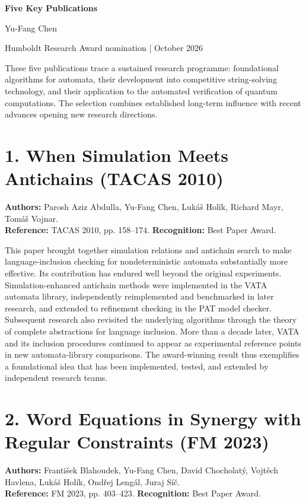 \documentclass[10pt,a4paper]{article}
\begin{document}
\begin{center}
{\Large\bfseries Five Key Publications}\par
{\normalsize Yu-Fang Chen}\par
{\small Humboldt Research Award nomination | October 2026}
\end{center}
\vspace{0.3em}
These five publications trace a sustained research programme: foundational algorithms for automata, their development into competitive string-solving technology, and their application to the automated verification of quantum computations. The selection combines established long-term influence with recent advances opening new research directions.\par
\section{1. When Simulation Meets Antichains (TACAS 2010)}
\textbf{Authors:} Parosh Aziz Abdulla, Yu-Fang Chen, Lukáš Holík, Richard Mayr, Tomáš Vojnar.\\
\textbf{Reference:} TACAS 2010, pp. 158--174. \textbf{Recognition:} Best Paper Award.

This paper brought together simulation relations and antichain search to make language-inclusion checking for nondeterministic automata substantially more effective. Its contribution has endured well beyond the original experiments. Simulation-enhanced antichain methods were implemented in the VATA automata library, independently reimplemented and benchmarked in later research, and extended to refinement checking in the PAT model checker. Subsequent research also revisited the underlying algorithms through the theory of complete abstractions for language inclusion. More than a decade later, VATA and its inclusion procedures continued to appear as experimental reference points in new automata-library comparisons. The award-winning result thus exemplifies a foundational idea that has been implemented, tested, and extended by independent research teams.

\section{2. Word Equations in Synergy with Regular Constraints (FM 2023)}
\textbf{Authors:} František Blahoudek, Yu-Fang Chen, David Chocholatý, Vojtěch Havlena, Lukáš Holík, Ondřej Lengál, Juraj Síč.\\
\textbf{Reference:} FM 2023, pp. 403--423. \textbf{Recognition:} Best Paper Award.
\end{document}
